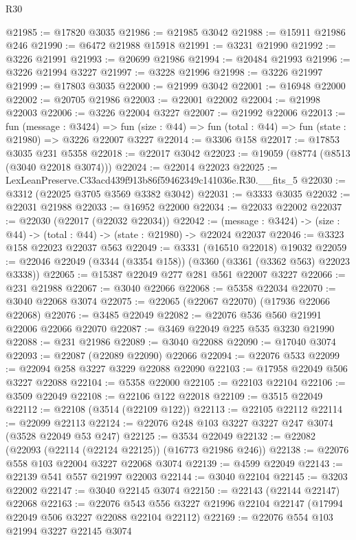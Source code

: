 \begin{lexlean}{R30}
\begin{coremodule}
@21985 := @17820 @3035
@21986 := @21985 @3042
@21988 := @15911 @21986 @246
@21990 := @6472 @21988 @15918
@21991 := @3231 @21990
@21992 := @3226 @21991
@21993 := @20699 @21986
@21994 := @20484 @21993
@21996 := @3226 @21994 @3227
@21997 := @3228 @21996
@21998 := @3226 @21997
@21999 := @17803 @3035
@22000 := @21999 @3042
@22001 := @16948 @22000
@22002 := @20705 @21986
@22003 := @22001 @22002
@22004 := @21998 @22003
@22006 := @3226 @22004 @3227
@22007 := @21992 @22006
@22013 := fun (message : @3424) =>
  fun (size : @44) => fun (total : @44) => fun (state : @21980) => @3226 @22007 @3227
@22014 := @3306 @158
@22017 := @17853 @3035 @231 @5358
@22018 := @22017 @3042
@22023 := @19059 (@8774 (@8513 (@3040 @22018 @3074)))
@22024 := @22014 @22023
@22025 := LexLeanPreserve.C33acd439f913b86f59462349c141036e.R30.__fits_5
@22030 := @3312 (@22025 @3705 @3569 @3382 @3042)
@22031 := @3333 @3035
@22032 := @22031 @21988
@22033 := @16952 @22000
@22034 := @22033 @22002
@22037 := @22030 (@22017 (@22032 @22034))
@22042 := (message : @3424) -> (size : @44) -> (total : @44) -> (state : @21980) -> @22024 @22037
@22046 := @3323 @158 @22023 @22037 @563
@22049 := @3331 (@16510 @22018) @19032
@22059 := @22046 @22049 (@3344 (@3354 @158)) (@3360 (@3361 (@3362 @563) @22023 @3338))
@22065 := @15387 @22049 @277 @281 @561 @22007 @3227
@22066 := @231 @21988
@22067 := @3040 @22066
@22068 := @5358 @22034
@22070 := @3040 @22068 @3074
@22075 := @22065 (@22067 @22070) (@17936 @22066 @22068)
@22076 := @3485 @22049
@22082 := @22076 @536 @560 @21991 @22006 @22066 @22070
@22087 := @3469 @22049 @225 @535 @3230 @21990
@22088 := @231 @21986
@22089 := @3040 @22088
@22090 := @17040 @3074
@22093 := @22087 (@22089 @22090) @22066
@22094 := @22076 @533
@22099 := @22094 @258 @3227 @3229 @22088 @22090
@22103 := @17958 @22049 @506 @3227 @22088
@22104 := @5358 @22000
@22105 := @22103 @22104
@22106 := @3509 @22049
@22108 := @22106 @122 @22018
@22109 := @3515 @22049
@22112 := @22108 (@3514 (@22109 @122))
@22113 := @22105 @22112
@22114 := @22099 @22113
@22124 := @22076 @248 @103 @3227 @3227 @247 @3074 (@3528 @22049 @53 @247)
@22125 := @3534 @22049
@22132 := @22082 (@22093 (@22114 (@22124 @22125)) (@16773 @21986 @246))
@22138 := @22076 @558 @103 @22004 @3227 @22068 @3074
@22139 := @4599 @22049
@22143 := @22139 @541 @557 @21997 @22003
@22144 := @3040 @22104
@22145 := @3203 @22002
@22147 := @3040 @22145 @3074
@22150 := @22143 (@22144 @22147) @22068
@22163 := @22076
    @543
    @556
    @3227
    @21996
    @22104
    @22147
    (@17994 @22049 @506 @3227 @22088 @22104 @22112)
@22169 := @22076 @554 @103 @21994 @3227 @22145 @3074

\end{coremodule}
\end{lexlean}

